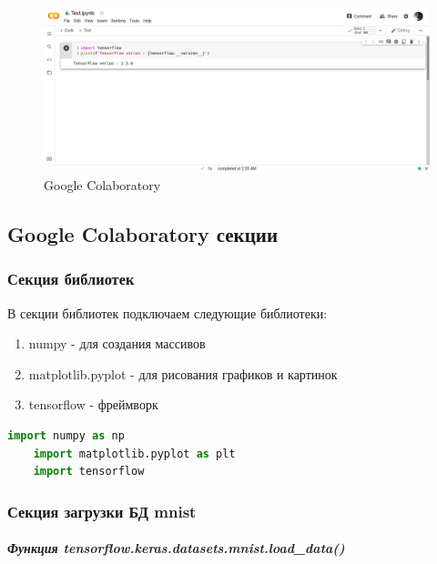 \begin{figure}[!htbp]
    \centering
    \includegraphics[width=16cm]
    {../_INCLUDES/main/4/GoogleColaboratory.png}
    \caption{Google Colaboratory}
    \label{fig:4_GoogleColaboratory}
\end{figure}



\subsection{Google Colaboratory секции}



\subsubsection{Секция библиотек}

В секции библиотек подключаем следующие библиотеки:

\begin{enumerate}
    \item numpy - для создания массивов
    \item matplotlib.pyplot - для рисования графиков и картинок
    \item tensorflow - фреймворк
\end{enumerate}

\begin{lstlisting}[language=Python,]
    import numpy as np
    import matplotlib.pyplot as plt
    import tensorflow
\end{lstlisting}



\subsubsection{Секция загрузки БД mnist}

\subparagraph{Функция tensorflow.keras.datasets.mnist.load\_data()} \hspace{0pt}

